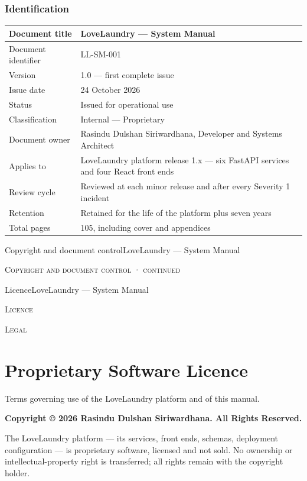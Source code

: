 \documentclass[11pt,a4paper,oneside]{book}
\begin{document}
\subsection*{Identification}
\begin{center}\small
\begin{tabularx}{\linewidth}{|X|X|}
\hline
Document title & LoveLaundry — System Manual \\ \hline
Document identifier & LL-SM-001 \\ \hline
Version & 1.0 — first complete issue \\ \hline
Issue date & 24 October 2026 \\ \hline
Status & Issued for operational use \\ \hline
Classification & Internal — Proprietary \\ \hline
Document owner & Rasindu Dulshan Siriwardhana, Developer and Systems Architect \\ \hline
Applies to & LoveLaundry platform release 1.x — six FastAPI services and four React front ends \\ \hline
Review cycle & Reviewed at each minor release and after every Severity 1 incident \\ \hline
Retention & Retained for the life of the platform plus seven years \\ \hline
Total pages & 105, including cover and appendices \\ \hline
\end{tabularx}
\end{center}
Copyright and document controlLoveLaundry — System Manual

\textsc{\small\color{crimson}Copyright and document control · continued}\par\medskip
LicenceLoveLaundry — System Manual

\textsc{\small\color{crimson}Licence}\par\medskip
\textsc{\small\color{crimson}Legal}\par\medskip
\chapter{Proprietary Software Licence}
Terms governing use of the LoveLaundry platform and of this manual.

\textbf{Copyright © 2026 Rasindu Dulshan Siriwardhana. All Rights Reserved.}

The LoveLaundry platform — its services, front ends, schemas, deployment configuration — is proprietary software, licensed and not sold. No ownership or intellectual-property right is transferred; all rights remain with the copyright holder.
\end{document}
